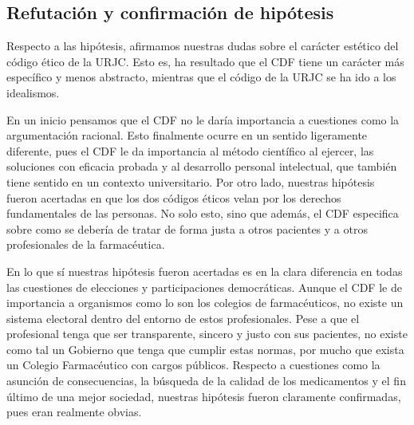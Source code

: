 \documentclass[11pt,a4paper]{article}
\begin{document}
\subsection{Refutación y confirmación de hipótesis}
Respecto a las hipótesis, afirmamos nuestras dudas sobre el carácter estético del código ético de la URJC. Esto es, ha resultado que el CDF tiene un carácter más específico y menos abstracto, mientras que el código de la URJC se ha ido a los idealismos. 

En un inicio pensamos que el CDF no le daría importancia a cuestiones como la argumentación racional. Esto finalmente ocurre en un sentido ligeramente diferente, pues el CDF le da importancia al método científico al ejercer, las soluciones con eficacia probada y al desarrollo personal intelectual, que también tiene sentido en un contexto universitario. Por otro lado, nuestras hipótesis fueron acertadas en que los dos códigos éticos velan por los derechos fundamentales de las personas. No solo esto, sino que además, el CDF especifica sobre como se debería de tratar de forma justa a otros pacientes y a otros profesionales de la farmacéutica.

En lo que sí nuestras hipótesis fueron acertadas es en la clara diferencia en todas las cuestiones de elecciones y participaciones democráticas. Aunque el CDF le de importancia a organismos como lo son los colegios de farmacéuticos, no existe un sistema electoral dentro del entorno de estos profesionales. Pese a que el profesional tenga que ser transparente, sincero y justo con sus pacientes, no existe como tal un Gobierno que tenga que cumplir estas normas, por mucho que exista un Colegio Farmacéutico con cargos públicos. Respecto a cuestiones como la asunción de consecuencias, la búsqueda de la calidad de los medicamentos y el fin último de una mejor sociedad, nuestras hipótesis fueron claramente confirmadas, pues eran realmente obvias.
\end{document}
